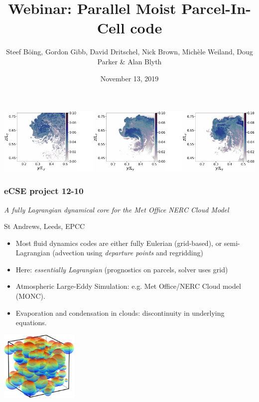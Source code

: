 \documentclass{beamer}
\title[MPIC]{Webinar: Parallel Moist Parcel-In-Cell code}
\author[B\"oing, Gibb, Dritschel, et al.]{{Steef B\"oing, Gordon Gibb, David Dritschel, Nick Brown, \newline Mich\`ele Weiland, Doug Parker \& Alan Blyth}\vspace{-0.5cm}}
\institute[]{{University of Leeds, University of St Andrews, EPCC}\vspace{-0.4cm}}
\date{November 13, 2019}
\begin{document}
\begin{frame}

\titlepage %

\vspace{-0.6cm}
\begin{center}
  \includegraphics[width = \textwidth]{pmpic_images/croppedfig_les.pdf}
\end{center}


\end{frame}

\begin{frame}

\tableofcontents
\end{frame}

\begin{frame}
\frametitle{eCSE project 12-10}
\textit{A fully Lagrangian dynamical core for the Met Office NERC Cloud Model}
\vspace{-0.2cm}
\begin{center}
St Andrews, Leeds, EPCC
\end{center}
\vspace{-0.2cm}
\begin{itemize}
\item Most fluid dynamics codes are either fully Eulerian (grid-based), or semi-Lagrangian (advection using \textit{departure points} and regridding)
\item Here: \textit{essentially Lagrangian} (prognostics on parcels, solver uses grid)
\item Atmospheric Large-Eddy Simulation: e.g. Met Office/NERC Cloud model (MONC). 
\item Evaporation and condensation in clouds: discontinuity in underlying equations.
\end{itemize}
\vspace{-0.8cm}

\begin{center}
  \includegraphics[width = 0.28\textwidth]{pmpic_images/parcels.pdf}
\end{center}

\end{frame}
\end{document}
